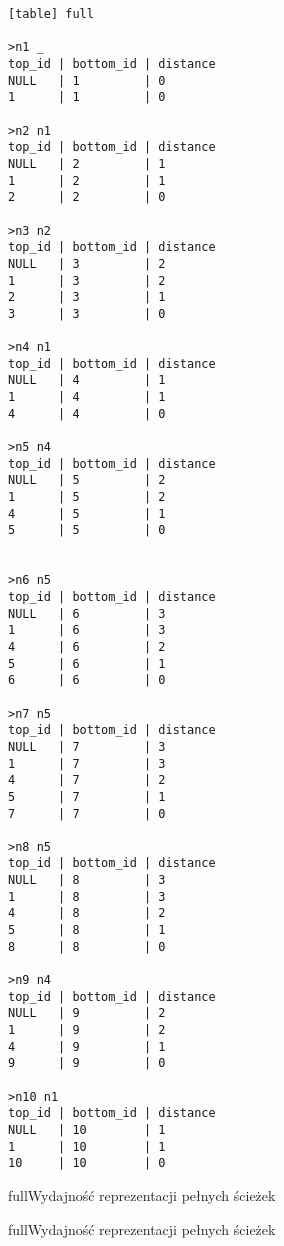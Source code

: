 \begin{verbatim}[table] full

>n1 _
top_id | bottom_id | distance
NULL   | 1         | 0
1      | 1         | 0

>n2 n1
top_id | bottom_id | distance
NULL   | 2         | 1
1      | 2         | 1
2      | 2         | 0

>n3 n2
top_id | bottom_id | distance
NULL   | 3         | 2
1      | 3         | 2
2      | 3         | 1
3      | 3         | 0

>n4 n1
top_id | bottom_id | distance
NULL   | 4         | 1
1      | 4         | 1
4      | 4         | 0

>n5 n4
top_id | bottom_id | distance
NULL   | 5         | 2
1      | 5         | 2
4      | 5         | 1
5      | 5         | 0


>n6 n5
top_id | bottom_id | distance
NULL   | 6         | 3
1      | 6         | 3
4      | 6         | 2
5      | 6         | 1
6      | 6         | 0

>n7 n5
top_id | bottom_id | distance
NULL   | 7         | 3
1      | 7         | 3
4      | 7         | 2
5      | 7         | 1
7      | 7         | 0

>n8 n5
top_id | bottom_id | distance
NULL   | 8         | 3
1      | 8         | 3
4      | 8         | 2
5      | 8         | 1
8      | 8         | 0

>n9 n4
top_id | bottom_id | distance
NULL   | 9         | 2
1      | 9         | 2
4      | 9         | 1
9      | 9         | 0

>n10 n1
top_id | bottom_id | distance
NULL   | 10        | 1
1      | 10        | 1
10     | 10        | 0

\end{verbatim}












\begin{qxtab}{full}{Wydajność reprezentacji pełnych ścieżek}
\end{qxtab}

\begin{qxfig}{full}{Wydajność reprezentacji pełnych ścieżek}
\end{qxfig}




